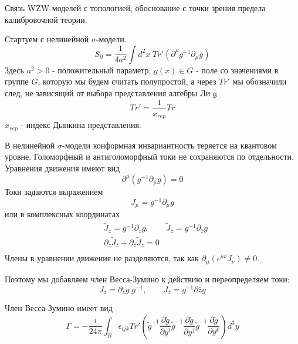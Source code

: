 \documentclass[a4paper,12pt]{article}
\theoremstyle{definition} \newtheorem{Def}{Definition}
\begin{document}
Связь WZW-моделей с топологией, обоснование с точки зрения предела калибровочной теории.

Стартуем с нелинейной $\sigma$-модели.
\begin{equation}
  \label{eq:48}
  S_0=\frac{1}{4a^2}\int d^2x\; Tr' (\partial^{\mu}g^{-1}\partial_{\mu}g)
\end{equation}
Здесь $a^2>0$ - положительный параметр, $g(x)\in G$ - поле со значениями в группе $G$, которую мы будем считать полупростой, а через $Tr'$ мы обозначили след, не зависящий от выбора представления алгебры Ли $\mathfrak{g} $
\begin{equation}
  \label{eq:70}
  Tr'=\frac{1}{x_{rep}}Tr
\end{equation}
$x_{rep}$ - индекс Дынкина представления.

В нелинейной $\sigma$-модели конформная инвариантность теряется на квантовом уровне.
Голоморфный и антиголоморфный токи не сохраняются по отдельности. Уравнения движения имеют вид    
\begin{equation}
  \label{eq:71}
  \partial^{\mu}(g^{-1}\partial_{\mu}g)=0
\end{equation}
Токи задаются выражением
\begin{equation}
  \label{eq:currents}
  J_{\mu}=g^{-1}\partial_{\mu}g
\end{equation}
или в комплексных координатах
\begin{equation}
  \label{eq:74}
  \begin{matrix}
    & \tilde{J}_z=g^{-1}\partial_z g, & \tilde{J}_{\bar{z}}=g^{-1}\partial_{\bar{z}}g\\
    & \partial_z \tilde{J}_{\bar{z}}+\partial_{\bar{z}}\tilde{J}_z=0 & \\
  \end{matrix}
\end{equation}
Члены в уравнении движения не разделяются, так как  $\partial_{\mu}(\epsilon^{\mu\nu}J_{\nu})\neq 0$.

Поэтому мы добавляем член Весса-Зумино к действию и переопределяем токи:
\begin{equation}
  \label{eq:72}
  J_z=\partial_z g\;g^{-1}, \qquad J_{\bar{z}}=g^{-1}\partial{\bar z}g
\end{equation}

Член Весса-Зумино имеет вид
\begin{equation}
  \label{eq:73}
\Gamma=  - \frac{i }{24\pi} \int_{B}\epsilon_{ijk} Tr'\left(
    \tilde g^{-1}\frac{\partial \tilde g}{\partial y^i}
      \tilde g^{-1}\frac{\partial \tilde g}{\partial y^j}
      \tilde g^{-1}\frac{\partial \tilde g}{\partial y^k}\right) d^3y
\end{equation}
\end{document}
